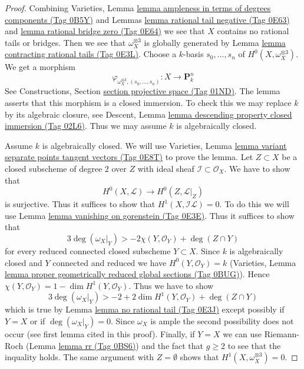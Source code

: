 \documentclass{amsart}
\theoremstyle{plain}
\theoremstyle{definition}
\theoremstyle{remark}
\numberwithin{equation}{subsection}
\begin{document}
\begin{proof}
Combining Varieties, Lemma
\href{https://stacks.math.columbia.edu/tag/0B5Y}{lemma ampleness in terms of degrees components (Tag 0B5Y)} and
Lemmas \href{https://stacks.math.columbia.edu/tag/0E63}{lemma rational tail negative (Tag 0E63)} and \href{https://stacks.math.columbia.edu/tag/0E64}{lemma rational bridge zero (Tag 0E64)}
we see that $X$ contains no rational tails or bridges.
Then we see that $\omega_X^{\otimes 3}$ is globally generated
by Lemma \href{https://stacks.math.columbia.edu/tag/0E3L}{lemma contracting rational tails (Tag 0E3L)}.
Choose a $k$-basis $s_0, \ldots, s_n$ of
$H^0(X, \omega_X^{\otimes 3})$. We get a morphism
$$
\varphi_{\omega_X^{\otimes 3}, (s_0, \ldots, s_n)} :
X \longrightarrow \mathbf{P}^n_k
$$
See Constructions, Section \href{https://stacks.math.columbia.edu/tag/01ND}{section projective space (Tag 01ND)}.
The lemma asserts that this morphism is a closed immersion.
To check this we may replace $k$ by its algebraic closure, see
Descent, Lemma \href{https://stacks.math.columbia.edu/tag/02L6}{lemma descending property closed immersion (Tag 02L6)}.
Thus we may assume $k$ is algebraically closed.

\medskip\noindent
Assume $k$ is algebraically closed.
We will use Varieties, Lemma
\href{https://stacks.math.columbia.edu/tag/0E8T}{lemma variant separate points tangent vectors (Tag 0E8T)}
to prove the lemma.
Let $Z \subset X$ be a closed subscheme of degree $2$ over $Z$
with ideal sheaf $\mathcal{I} \subset \mathcal{O}_X$.
We have to show that
$$
H^0(X, \mathcal{L}) \to H^0(Z, \mathcal{L}|_Z)
$$
is surjective. Thus it suffices to show that
$H^1(X, \mathcal{I}\mathcal{L}) = 0$.
To do this we will use Lemma \href{https://stacks.math.columbia.edu/tag/0E3E}{lemma vanishing on gorenstein (Tag 0E3E)}.
Thus it suffices to show that
$$
3\deg(\omega_X|_Y) > -2\chi(Y, \mathcal{O}_Y) + \deg(Z \cap Y)
$$
for every reduced connected closed subscheme $Y \subset X$.
Since $k$ is algebraically closed and $Y$ connected and reduced
we have $H^0(Y, \mathcal{O}_Y) = k$ (Varieties, Lemma
\href{https://stacks.math.columbia.edu/tag/0BUG}{lemma proper geometrically reduced global sections (Tag 0BUG)}).
Hence $\chi(Y, \mathcal{O}_Y) = 1 - \dim H^1(Y, \mathcal{O}_Y)$.
Thus we have to show
$$
3\deg(\omega_X|_Y) > -2 + 2\dim H^1(Y, \mathcal{O}_Y) + \deg(Z \cap Y)
$$
which is true by Lemma \href{https://stacks.math.columbia.edu/tag/0E3J}{lemma no rational tail (Tag 0E3J)}
except possibly if $Y = X$ or if $\deg(\omega_X|_Y) = 0$.
Since $\omega_X$ is ample the second possibility does not
occur (see first lemma cited in this proof). Finally, if
$Y = X$ we can use Riemann-Roch (Lemma \href{https://stacks.math.columbia.edu/tag/0BS6}{lemma rr (Tag 0BS6)})
and the fact that $g \geq 2$ to see that the inquality holds.
The same argument with $Z = \emptyset$ shows that
$H^1(X, \omega_X^{\otimes 3}) = 0$.
\end{proof}
\end{document}
